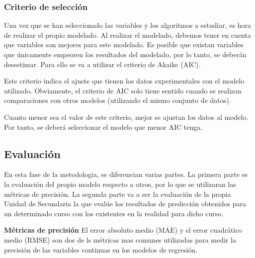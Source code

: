 \subsubsection{Criterio de selección}

Una vez que se han seleccionado las variables y los algoritmos a estudiar, es hora de realizar el propio modelado. Al realizar el modelado, debemos tener en cuenta que variables son mejores para este modelado. Es posible que existan variables que únicamente empeoren los resultados del modelado, por lo tanto, se deberán desestimar. Para ello se va a utilizar el criterio de Akaike (AIC). 

Este criterio indica el ajuste que tienen los datos experimentales con el modelo utilizado. Obviamente, el criterio de AIC solo tiene sentido cuando se realizan comparaciones con otros modelos (utilizando el mismo conjunto de datos). \cite{martinez2009criterio}

Cuanto menor sea el valor de este criterio, mejor se ajustan los datos al modelo. Por tanto, se deberá seleccionar el modelo que menor AIC tenga. \cite{martinez2009criterio}

\subsection{Evaluación}
En esta fase de la metodologia, se diferencian varias partes. La primera parte es la evaluación del propio modelo respecto a otros, por lo que se utilizaran las métricas de precisión. La segunda parte va a ser la evaluación de la propia Unidad de Secundaria la que evalúe los resultados de predicción obtenidos para un determinado curso con los existentes en la realidad para dicho curso.

\textbf{Métricas de precisión}
El error absoluto medio (MAE) y el error cuadrático medio (RMSE) son dos de ls métricas mas comunes utilizadas para medir la precisión de las variables continuas en los modelos de regresión.

